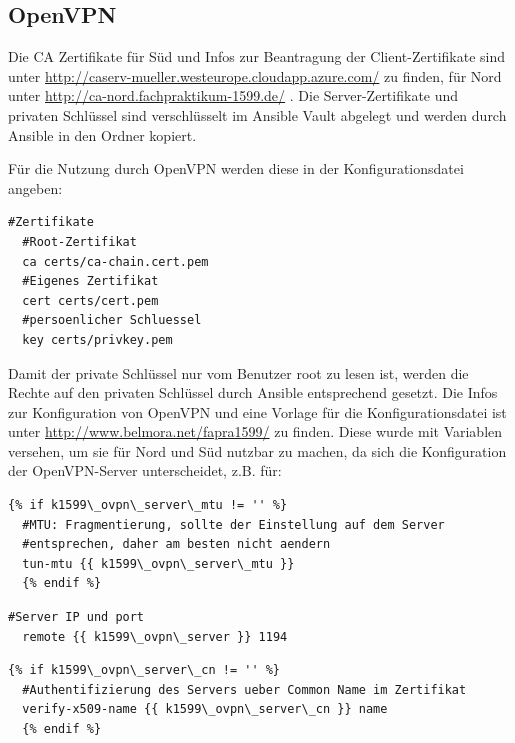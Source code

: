 \subsection{OpenVPN}
Die CA Zertifikate für Süd und Infos zur Beantragung der Client-Zertifikate sind unter \url{http://caserv-mueller.westeurope.cloudapp.azure.com/} zu finden, für Nord unter \url{http://ca-nord.fachpraktikum-1599.de/} . Die Server-Zertifikate und privaten Schlüssel sind verschlüsselt im Ansible Vault abgelegt und werden durch Ansible in den Ordner  kopiert.

Für die Nutzung durch OpenVPN werden diese in der Konfigurationsdatei angeben:

\begin{lstlisting}[label=code:openvpn,caption=Auszug aus /etc/openvpn/client.conf]
  #Zertifikate
  #Root-Zertifikat
  ca certs/ca-chain.cert.pem
  #Eigenes Zertifikat
  cert certs/cert.pem
  #persoenlicher Schluessel
  key certs/privkey.pem
\end{lstlisting}

Damit der private Schlüssel nur vom Benutzer root zu lesen ist, werden die Rechte auf den privaten Schlüssel durch Ansible entsprechend gesetzt. Die Infos zur Konfiguration von OpenVPN und eine Vorlage für die Konfigurationsdatei ist unter \url{http://www.belmora.net/fapra1599/} zu finden. Diese wurde mit Variablen versehen, um sie für Nord und Süd nutzbar zu machen, da sich die Konfiguration der OpenVPN-Server unterscheidet, z.B. für:

\begin{lstlisting}[label=code:tunnelmtu,caption=Tunnel-MTU]
  {% if k1599\_ovpn\_server\_mtu != '' %}
  #MTU: Fragmentierung, sollte der Einstellung auf dem Server
  #entsprechen, daher am besten nicht aendern
  tun-mtu {{ k1599\_ovpn\_server\_mtu }}
  {% endif %}
\end{lstlisting}

\begin{lstlisting}[label=code:vpnserver,caption=OpenVPN-Server]
  #Server IP und port
  remote {{ k1599\_ovpn\_server }} 1194
\end{lstlisting}

\begin{lstlisting}[label=code:certtitle,caption=Zertifikats-Betreff]
  {% if k1599\_ovpn\_server\_cn != '' %}
  #Authentifizierung des Servers ueber Common Name im Zertifikat
  verify-x509-name {{ k1599\_ovpn\_server\_cn }} name
  {% endif %}
\end{lstlisting}

